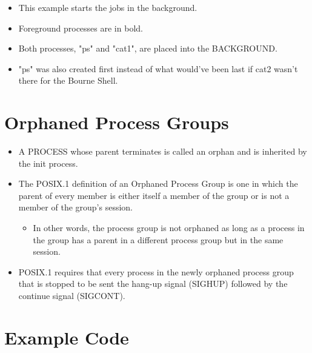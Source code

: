 \documentclass{article}
\begin{document}
\begin{itemize}
    \item This example starts the jobs in the background.
    \item Foreground processes are in bold.
    \item Both processes, "ps" and "cat1", are placed into the BACKGROUND.
    \item "ps" was also created first instead of what would've been last if 
        cat2 wasn't there for the Bourne Shell.
\end{itemize}

\section{Orphaned Process Groups}

\begin{itemize}
    \item A PROCESS whose parent terminates is called an orphan and is inherited by the init process.
    \item The POSIX.1 definition of an Orphaned Process Group is one in which the parent of every member is either itself a member of the group or is not a member of the group's session.
        \begin{itemize}
            \item In other words, the process group is not orphaned as long as a process in the group has a parent in a different process group but in the same session.
        \end{itemize}
    \item POSIX.1 requires that every process in the newly orphaned process group that is stopped to be sent the hang-up signal (SIGHUP) followed by the continue signal (SIGCONT).
\end{itemize}

\section{Example Code}
\end{document}
